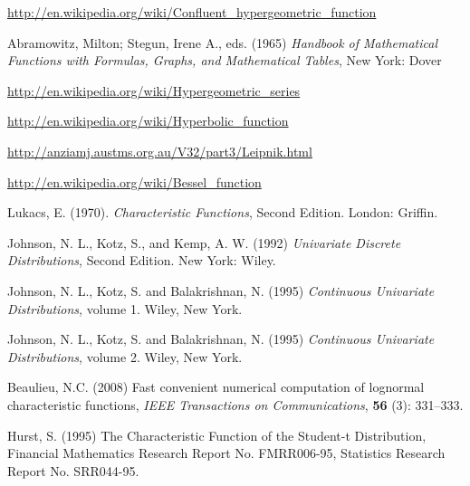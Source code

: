 \documentclass[english]{article}
\begin{document}
\begin{thebibliography}{12}
\appendix
{}\url{http://en.wikipedia.org/wiki/Confluent_hypergeometric_function}

Abramowitz, Milton; Stegun, Irene A., eds. (1965)
\emph{Handbook of Mathematical Functions with Formulas, Graphs, and
Mathematical Tables}, New York: Dover

\url{http://en.wikipedia.org/wiki/Hypergeometric_series}

\url{http://en.wikipedia.org/wiki/Hyperbolic_function}

\url{http://anziamj.austms.org.au/V32/part3/Leipnik.html}

\url{http://en.wikipedia.org/wiki/Bessel_function}

Lukacs, E. (1970). \emph{Characteristic Functions},
Second Edition. London: Griffin.

Johnson, N. L., Kotz, S., and Kemp, A. W. (1992)
\emph{Univariate Discrete Distributions}, Second Edition. New York:
Wiley.

Johnson, N. L., Kotz, S. and Balakrishnan, N. (1995)
\emph{Continuous Univariate Distributions}, volume 1. Wiley, New York.

Johnson, N. L., Kotz, S. and Balakrishnan, N. (1995)
\emph{Continuous Univariate Distributions}, volume 2. Wiley, New York.

Beaulieu, N.C. (2008) Fast convenient numerical computation
of lognormal characteristic functions, \emph{IEEE Transactions on
Communications}, \textbf{56} (3): 331--333.

Hurst, S. (1995) The Characteristic Function of
the Student-t Distribution, Financial Mathematics Research Report
No. FMRR006-95, Statistics Research Report No. SRR044-95.
\end{thebibliography}
\end{document}
